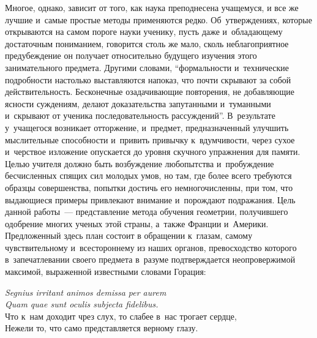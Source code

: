 \documentclass[letters,booklanguage=russian]{byrnebook}
\begin{document}
Многое, однако, зависит от того, как наука преподнесена учащемуся, и все же лучшие и~самые простые методы применяются редко. Об~утверждениях, которые открываются на самом пороге науки ученику, пусть даже и~обладающему достаточным пониманием, говорится столь же мало, сколь неблагоприятное  предубеждение он получает относительно будущего изучения этого занимательного предмета. Другими словами, \enquote{формальности и~технические подробности настолько выставляются напоказ, что почти скрывают за собой действительность. Бесконечные  озадачивающие повторения, не добавляющие ясности суждениям, делают доказательства запутанными и~туманными и~скрывают от ученика последовательность рассуждений}. В~результате у~учащегося возникает отторжение, и~предмет, предназначенный улучшить мыслительные способности и~привить привычку к~вдумчивости, через сухое и~черствое изложение опускается до уровня скучного упражнения для памяти. Целью учителя должно быть возбуждение любопытства и~пробуждение бесчисленных спящих сил молодых умов, но там, где более всего требуются образцы совершенства, попытки достичь его немногочисленны, при том, что выдающиеся примеры привлекают внимание и~порождают подражания. Цель данной работы~— представление метода обучения геометрии, получившего одобрение многих ученых этой страны, а~также Франции и~Америки. Предложенный здесь план состоит в обращении к~глазам, самому чувствительному и~всестороннему из наших органов, превосходство которого в~запечатлевании своего предмета в~разуме подтверждается неопровержимой максимой, выраженной известными словами Горация:

\begin{center}
\emph{Segnius irritant animos demissa per aurem\\
Quam quae sunt oculis subjecta fidelibus.}\\
\vfill\pagebreak
{}Что к~нам доходит чрез слух, то слабее в~нас трогает сердце,\\
Нежели то, что само представляется верному глазу. %
\end{center}
\end{document}
